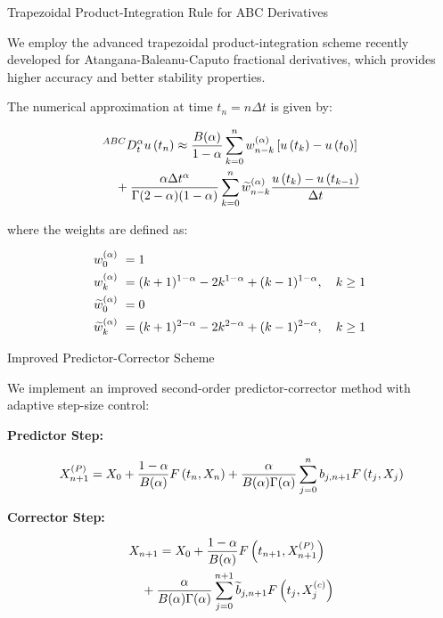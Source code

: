 \documentclass[10pt]{NSP1}
\newcommand{\fitwidth}[1]{\resizebox{\ifdim\width>\linewidth\linewidth\else\width\fi}{!}{#1}}
\begin{document}
Trapezoidal Product-Integration Rule for ABC Derivatives

We employ the advanced trapezoidal product-integration scheme recently developed for Atangana-Baleanu-Caputo fractional derivatives, which provides higher accuracy and better stability properties.

The numerical approximation at time \(t_{n} = n\Delta t\) is given by:

\[
\fitwidth{$\displaystyle \begin{aligned}
&^{ABC}D_{t}^{\alpha}u\left( t_{n} \right) \approx \frac{B(\alpha)}{1 - \alpha}\sum_{k = 0}^{n}{}w_{n - k}^{(\alpha)}\left\lbrack u\left( t_{k} \right) - u\left( t_{0} \right) \right\rbrack \\
&\quad + \frac{\alpha\Delta t^{\alpha}}{\Gamma(2 - \alpha)(1 - \alpha)}\sum_{k = 0}^{n}{}{\widetilde{w}}_{n - k}^{(\alpha)}\frac{u\left( t_{k} \right) - u\left( t_{k - 1} \right)}{\Delta t}
\end{aligned}$}
\]

where the weights are defined as:

\[
\fitwidth{$\displaystyle \begin{aligned}
w_{0}^{(\alpha)}\ &= 1 \\
w_{k}^{(\alpha)}\ &= (k + 1)^{1 - \alpha} - 2k^{1 - \alpha} + (k - 1)^{1 - \alpha},\quad k \geq 1 \\
{\widetilde{w}}_{0}^{(\alpha)}\ &= 0 \\
{\widetilde{w}}_{k}^{(\alpha)}\ &= (k + 1)^{2 - \alpha} - 2k^{2 - \alpha} + (k - 1)^{2 - \alpha},\quad k \geq 1\
\end{aligned}$}
\]

Improved Predictor-Corrector Scheme

We implement an improved second-order predictor-corrector method with adaptive step-size control:

\textbf{Predictor Step:}

\[
\fitwidth{$\displaystyle X_{n + 1}^{(P)} = X_{0} + \frac{1 - \alpha}{B(\alpha)}F\left( t_{n},X_{n} \right) + \frac{\alpha}{B(\alpha)\Gamma(\alpha)}\sum_{j = 0}^{n}{}b_{j,n + 1}F\left( t_{j},X_{j} \right)$}
\]

\textbf{Corrector Step:}

\[
\fitwidth{$\displaystyle \begin{aligned}
&X_{n + 1} = X_{0} + \frac{1 - \alpha}{B(\alpha)}F\left( t_{n + 1},X_{n + 1}^{(P)} \right) \\
&\quad + \frac{\alpha}{B(\alpha)\Gamma(\alpha)}\sum_{j = 0}^{n + 1}{}{\widetilde{b}}_{j,n + 1}F\left( t_{j},X_{j}^{(c)} \right)
\end{aligned}$}
\]
\end{document}
